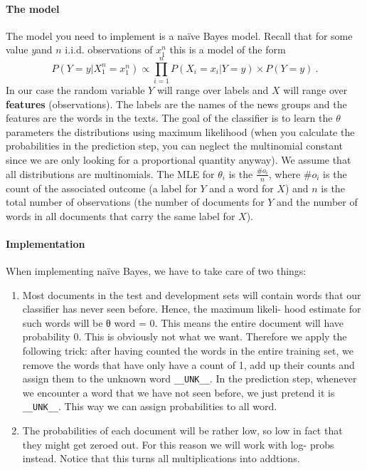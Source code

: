 \documentclass[11pt, leqno, a4paper]{article}
\begin{document}
\paragraph{The model} The model you need to implement is a na\"ive Bayes model. Recall that for some value $ y $and $ n $ i.i.d. observations
of $ x_{1}^{n} $ this is a model
of the form
$$ P(Y=y|X_{1}^{n}=x_{1}^{n}) \propto \underset{i=1}{\overset{n}{\prod}} P(X_{i}=x_{i}|Y=y) \times  P(Y=y) \ . $$
In our case the random variable $ Y $ will range over labels and $ X $ will range over \textbf{features} (observations).
The labels are the names of the news groups and the features are the words in the texts. The goal of the classifier is
to learn the $ \theta $ parameters the distributions using maximum likelihood (when you calculate the probabilities
in the prediction step, you can neglect the multinomial constant since we are only looking for a proportional
quantity anyway). We assume that all distributions are multinomials. The MLE for $ \theta_{i} $ is the $ \frac{\#o_{i}}{n} $,
where $ \#o_{i} $ is the count of the associated outcome (a label for $ Y $ and a word for $ X $) and $ n $ is the total
number of observations (the number of documents for $ Y $ and the number of words in all documents that carry the same
label for $ X $). 

\paragraph{Implementation} When implementing na\"ive Bayes, we have to take care of two things:
\begin{enumerate}
\item Most documents in the test and development sets will contain words
that our classifier has never seen before. Hence, the maximum likeli-
hood estimate for such words will be θ word = 0. This means the entire
document will have probability 0. This is obviously not what we want.
Therefore we apply the following trick: after having counted the words
in the entire training set, we remove the words that have only have a
count of 1, add up their counts and assign them to the unknown word
\texttt{\_\_UNK\_\_}. In the prediction step, whenever we encounter a word that we
have not seen before, we just pretend it is \texttt{\_\_UNK\_\_}. This way we can
assign probabilities to all word.
\item The probabilities of each document will be rather low, so low in fact
that they might get zeroed out. For this reason we will work with log-
probs instead. Notice that this turns all multiplications into addtions.
\end{enumerate}
\end{document}
